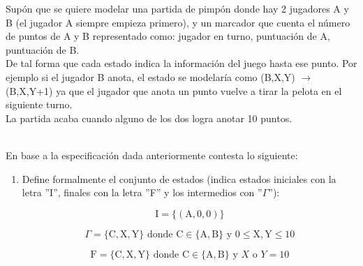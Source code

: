     \begin{exercise}
    
        Supón que se quiere modelar una partida de pimpón donde hay 2 jugadores A y B (el jugador A siempre empieza primero), y un marcador que cuenta el número de puntos de A y B representado como: jugador en turno, puntuación de A, puntuación de B. \\ 
   
        De tal forma que cada estado indica la información del juego hasta ese punto. Por ejemplo si el jugador B anota, el estado se modelaría como (B,X,Y) $\rightarrow$ (B,X,Y+1)  ya que el jugador que anota un punto vuelve a tirar la pelota en el siguiente turno.\\
    
        La partida acaba cuando alguno de los dos logra anotar 10 puntos. \\\

        En base a la especificación dada anteriormente contesta lo siguiente:\\

        \begin{enumerate}
            \item Define formalmente el conjunto de estados (indica estados iniciales con la letra  ''I'', finales con la letra  ''F'' y los intermedios con ''$\Gamma$''): 

                \begin{equation}
                    \text{I} = \{(\text{A},0,0)\}\nonumber
                 \end{equation}    

                 \begin{equation}
                    \Gamma = \{\text{C},\text{X},\text{Y}\} \text{ donde } \text{C} \in \{\text{A},\text{B}\} \text{ y } 0 \leq \text{X},\text{Y} \leq 10\nonumber
                 \end{equation}

                \begin{equation}
                    \text{F} =  \{\text{C},\text{X},\text{Y}\} \text{ donde } \text{C} \in \{\text{A},\text{B}\} \text{ y } X \text{ o } Y = 10\nonumber
                \end{equation}


\end{enumerate}
\end{exercise}
